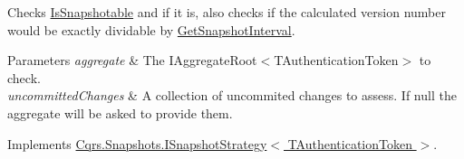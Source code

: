 Checks \hyperlink{classCqrs_1_1Snapshots_1_1DefaultSnapshotStrategy_acdbb918ac01b526aedb5fa9a3879887a_acdbb918ac01b526aedb5fa9a3879887a}{Is\+Snapshotable} and if it is, also checks if the calculated version number would be exactly dividable by \hyperlink{classCqrs_1_1Snapshots_1_1DefaultSnapshotStrategy_a3540a6d621d8c23816da761f929d83a7_a3540a6d621d8c23816da761f929d83a7}{Get\+Snapshot\+Interval}. 


\begin{DoxyParams}{Parameters}
{\em aggregate} & The I\+Aggregate\+Root$<$\+T\+Authentication\+Token$>$ to check.\\
\hline
{\em uncommitted\+Changes} & A collection of uncommited changes to assess. If null the aggregate will be asked to provide them.\\
\hline
\end{DoxyParams}


Implements \hyperlink{interfaceCqrs_1_1Snapshots_1_1ISnapshotStrategy_aeb5fc714ec8a5b60219426f3aabc0f6c_aeb5fc714ec8a5b60219426f3aabc0f6c}{Cqrs.\+Snapshots.\+I\+Snapshot\+Strategy$<$ T\+Authentication\+Token $>$}.

